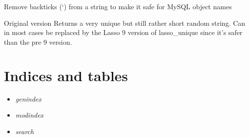 \documentclass[letterpaper,10pt,english]{sphinxmanual}
\begin{document}

\begin{fulllineitems}
Remove backticks ({}`) from a string to make it safe for MySQL object names

\end{fulllineitems}


\begin{fulllineitems}
\label{knop_utils:knop_unique}
Original version
Returns a very unique but still rather short random string. Can in most cases be replaced by the Lasso 9 version of lasso\_unique since it's safer than the pre 9 version.

\end{fulllineitems}


\begin{fulllineitems}
\label{knop_utils:knop_unique9}
\end{fulllineitems}


\begin{fulllineitems}
\end{fulllineitems}



\chapter{Indices and tables}
\label{index:indices-and-tables}\begin{itemize}
\item {} 
\emph{genindex}

\item {} 
\emph{modindex}

\item {} 
\emph{search}

\end{itemize}



\renewcommand{\indexname}{Index}
\printindex
\end{document}
